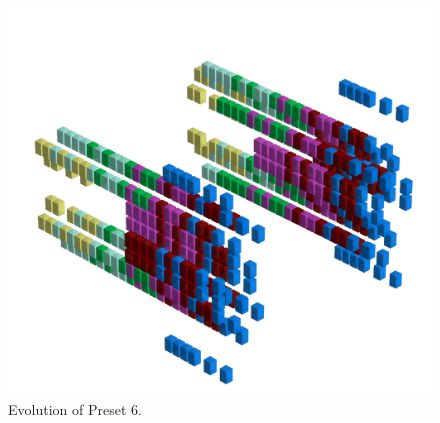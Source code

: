 \clearpage                                                                 
\begin{figure}[H]                                                          
  \centering                                                             
  \begin{adjustbox}{width=14cm,center}                                   
  \includegraphics[width=14cm]{src/presets/pattern6-45.png}%
  \end{adjustbox}                                                        
\caption{Evolution of Preset 6.}                                           
\end{figure}                                                               
\clearpage                                                                 
                                                                           
